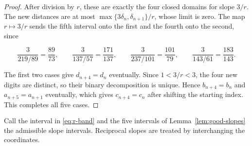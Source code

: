 \documentclass[11pt,a4paper]{amsart}
\numberwithin{equation}{section}
\theoremstyle{definition}
\begin{document}
\begin{proof}
After division by \(r\), these are exactly the four closed
domains for slope \(3/r\). The new distances are at most
\(\max\{3\delta_n,\delta_{n+1}\}/r\), whose limit is zero.
The map \(r\mapsto3/r\) sends the fifth interval onto the first
and the fourth onto the second, since

\[
\frac3{219/89}=\frac{89}{73},\qquad
\frac3{137/57}=\frac{171}{137},\qquad
\frac3{237/101}=\frac{101}{79},\qquad
\frac3{143/61}=\frac{183}{143}.
\]

The first two cases give \(d_{n+4}=d_n\) eventually. Since
\(1<3/r<3\), the four new digits are distinct, so their binary
decomposition is unique. Hence \(b_{n+4}=b_n\) and
\(a_{n+5}=a_{n+1}\) eventually, which gives \(c_{n+4}=c_n\)
after shifting the starting index. This completes all five cases.
\end{proof}

Call the interval in \eqref{eq:r-band} and the five intervals of
Lemma~\ref{lem:good-slopes} the admissible slope intervals.
Reciprocal slopes are treated by interchanging the coordinates.
\end{document}
